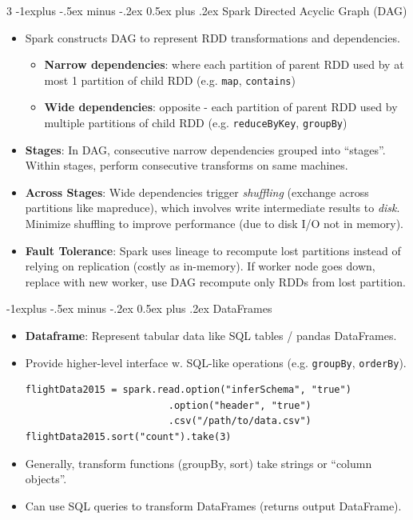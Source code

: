 \documentclass[a4paper, 9pt, landscape]{article}
\makeatletter
\renewcommand{\subsection}{\@startsection{subsection}{2}{0mm}%
                                {-1explus -.5ex minus -.2ex}%
                                {0.5ex plus .2ex}%
                                {\normalfont\normalsize\bfseries}}
\makeatother
\begin{document}
\begin{multicols*}{3}
\subsection{Spark Directed Acyclic Graph (DAG)}
\begin{itemize}
\item Spark constructs DAG to represent RDD transformations and dependencies.
	\begin{itemize}
	\item  \textbf{Narrow dependencies}: where each partition of parent RDD used by at most 1 partition of child RDD (e.g. \texttt{map}, \texttt{contains})
	\item \textbf{Wide dependencies}: opposite - each partition of parent RDD used by multiple partitions of child RDD (e.g. \texttt{reduceByKey}, \texttt{groupBy})
	\end{itemize}
\item \textbf{Stages}: In DAG, consecutive narrow dependencies grouped into “stages”. Within stages, perform consecutive transforms on same machines.
\item \textbf{Across Stages}: Wide dependencies trigger \textit{shuffling} (exchange across partitions like mapreduce), which involves write intermediate results to \textit{disk}. Minimize shuffling to improve performance (due to disk I/O not in memory).
\item \textbf{Fault Tolerance}: Spark uses lineage to recompute lost partitions instead of relying on replication (costly as in-memory). If worker node goes down, replace with new worker, use DAG recompute only RDDs from lost partition.
\end{itemize}
 

\subsection{DataFrames}
\begin{itemize}
\item \textbf{Dataframe}: Represent tabular data like SQL tables / pandas DataFrames.
\item Provide higher-level interface w. SQL-like operations (e.g. \texttt{groupBy}, \texttt{orderBy}).
	\begin{verbatim}
flightData2015 = spark.read.option("inferSchema", "true")
                         .option("header", "true")
                         .csv("/path/to/data.csv")
flightData2015.sort("count").take(3)
    \end{verbatim} \vspace{-1.5em}
\item Generally, transform functions (groupBy, sort) take strings or “column objects”.
\item Can use SQL queries to transform DataFrames (returns output DataFrame).
\end{itemize}


\end{multicols*}
\end{document}
